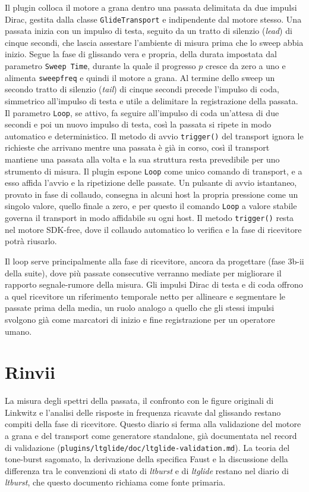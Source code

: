 \documentclass[11pt,a4paper]{article}
\begin{document}
Il plugin colloca il motore a grana dentro una passata delimitata da due impulsi Dirac, gestita dalla classe \texttt{GlideTransport} e indipendente dal motore stesso.
Una passata inizia con un impulso di testa, seguito da un tratto di silenzio (\emph{lead}) di cinque secondi, che lascia assestare l'ambiente di misura prima che lo sweep abbia inizio.
Segue la fase di glissando vera e propria, della durata impostata dal parametro \texttt{Sweep Time}, durante la quale il progresso $p$ cresce da zero a uno e alimenta \texttt{sweepfreq} e quindi il motore a grana.
Al termine dello sweep un secondo tratto di silenzio (\emph{tail}) di cinque secondi precede l'impulso di coda, simmetrico all'impulso di testa e utile a delimitare la registrazione della passata.
Il parametro \texttt{Loop}, se attivo, fa seguire all'impulso di coda un'attesa di due secondi e poi un nuovo impulso di testa, cos\`i la passata si ripete in modo automatico e deterministico.
Il metodo di avvio \texttt{trigger()} del transport ignora le richieste che arrivano mentre una passata \`e gi\`a in corso, cos\`i il transport mantiene una passata alla volta e la sua struttura resta prevedibile per uno strumento di misura.
Il plugin espone \texttt{Loop} come unico comando di transport, e a esso affida l'avvio e la ripetizione delle passate.
Un pulsante di avvio istantaneo, provato in fase di collaudo, consegna in alcuni host la propria pressione come un singolo valore, quello finale a zero, e per questo il comando \texttt{Loop} a valore stabile governa il transport in modo affidabile su ogni host.
Il metodo \texttt{trigger()} resta nel motore SDK-free, dove il collaudo automatico lo verifica e la fase di ricevitore potr\`a riusarlo.

Il loop serve principalmente alla fase di ricevitore, ancora da progettare (fase 3b-ii della suite), dove pi\`u passate consecutive verranno mediate per migliorare il rapporto segnale-rumore della misura.
Gli impulsi Dirac di testa e di coda offrono a quel ricevitore un riferimento temporale netto per allineare e segmentare le passate prima della media, un ruolo analogo a quello che gli stessi impulsi svolgono gi\`a come marcatori di inizio e fine registrazione per un operatore umano.

\section{Rinvii}\label{sec:rinvii}

La misura degli spettri della passata, il confronto con le figure originali di Linkwitz e l'analisi delle risposte in frequenza ricavate dal glissando restano compiti della fase di ricevitore.
Questo diario si ferma alla validazione del motore a grana e del transport come generatore standalone, gi\`a documentata nel record di validazione (\texttt{plugins/ltglide/doc/ltglide-validation.md}).
La teoria del tone-burst sagomato, la derivazione della specifica Faust e la discussione della differenza tra le convenzioni di stato di \emph{ltburst} e di \emph{ltglide} restano nel diario di \emph{ltburst}, che questo documento richiama come fonte primaria.



\end{document}
